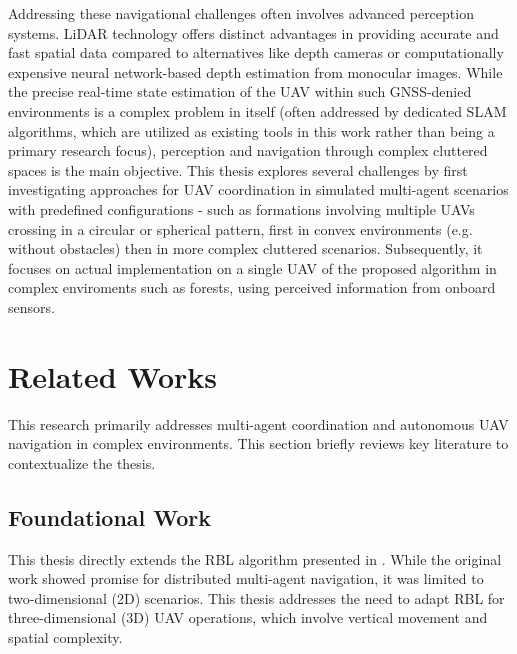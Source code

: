 Addressing these navigational challenges often involves advanced perception systems. 
\ac{LiDAR} technology offers distinct advantages in providing accurate and fast spatial data compared to alternatives like depth cameras or computationally expensive neural network-based depth estimation from monocular images. 
While the precise real-time state estimation of the \ac{UAV} within such \ac{GNSS}-denied environments is a complex problem in itself (often addressed by dedicated \ac{SLAM} algorithms, which are utilized as existing tools in this work rather than being a primary research focus), perception and navigation through complex cluttered spaces is the main objective.
This thesis explores several challenges by first investigating approaches for \ac{UAV} coordination in simulated multi-agent scenarios with predefined configurations - such as formations involving multiple \ac{UAV}s crossing in a circular or spherical pattern, first in convex environments (e.g. without obstacles) then in more complex cluttered scenarios. 
Subsequently, it focuses on actual implementation on a single \ac{UAV} of the proposed algorithm in complex enviroments such as forests, using perceived information from onboard sensors.

\section{Related Works}

  This research primarily addresses multi-agent coordination and autonomous \ac{UAV} navigation in complex environments. 
  This section briefly reviews key literature to contextualize the thesis.
  \subsection{Foundational Work}
    This thesis directly extends the \ac{RBL} algorithm presented in \cite{rbl_paper}. 
    While the original work showed promise for distributed multi-agent navigation, it was limited to two-dimensional (2D) scenarios. 
    This thesis addresses the need to adapt \ac{RBL} for three-dimensional (3D) \ac{UAV} operations, which involve vertical movement and spatial complexity.


